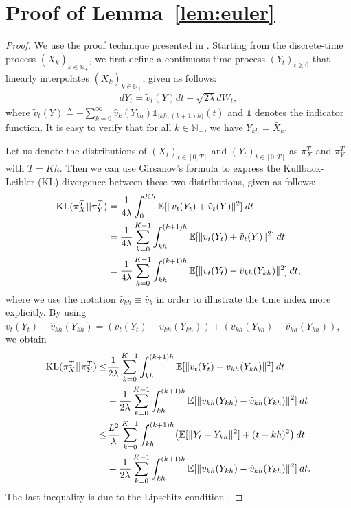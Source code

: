 \section{Proof of Lemma~\ref{lem:euler}}
%
%
\begin{proof}
We use the proof technique presented in \cite{dalalyan2017theoretical,raginsky17a}. Starting from the discrete-time process $(\bar{X}_k)_{k\in \mathbb{N}_+}$, we first define a continuous-time process $(Y_t)_{t\geq 0}$ that linearly interpolates $(\bar{X}_k)_{k\in \mathbb{N}_+}$, given as follows: 
\begin{align}
d Y_t = \tilde{v}_t(Y) dt + \sqrt{2 \lambda} dW_t, \label{eqn:sde_linear}
\end{align}
where $\tilde{v}_t(Y) \triangleq - \sum_{k=0}^{\infty} \hat{v}_k (Y_{kh}) \mathds{1}_{[kh, (k+1)h)}(t)$ and $\mathds{1}$ denotes the indicator function. It is easy to verify that for all $k \in \mathbb{N}_+$, we have $Y_{kh} = \bar{X}_k$. 

Let us denote the distributions of $(X_t)_{t \in [0,T]}$ and $(Y_t)_{t \in [0,T]}$ as $\pi_{X}^T$ and $\pi_{Y}^T$ with $T = Kh$. Then we can use Girsanov's formula to express the Kullback-Leibler (KL) divergence between these two distributions, given as follows:
\begin{align}
\textnormal{KL} (\pi_{X}^T || \pi_{Y}^T) &= \frac1{4 \lambda} \int_0^{Kh} \mathbb{E}[ \|v_t(Y_t) + \tilde{v}_t(Y) \|^2 ]  \> dt \\
&= \frac1{4 \lambda} \sum_{k=0}^{K-1} \int_{kh}^{(k+1)h} \mathbb{E}[ \|v_t(Y_t) + \tilde{v}_t(Y) \|^2 ] \> dt \\
&= \frac1{4 \lambda} \sum_{k=0}^{K-1} \int_{kh}^{(k+1)h} \mathbb{E}[ \|v_t(Y_t) - \hat{v}_{kh}(Y_{kh}) \|^2 ] \> dt,
\end{align}
where we use the notation $\hat{v}_{kh} \equiv \hat{v}_{k}$ in order to illustrate the time index more explicitly. By using $v_t(Y_t) - \hat{v}_{kh}(Y_{kh}) = ( v_t(Y_t) - v_{kh}(Y_{kh})) + ( v_{kh}(Y_{kh}) - \hat{v}_{kh}(Y_{kh}))$, we obtain
%
\begin{align}
\nonumber \textnormal{KL} (\pi_{X}^T || \pi_{Y}^T) \leq& \frac1{2 \lambda} \sum_{k=0}^{K-1} \int_{kh}^{(k+1)h} \mathbb{E}[ \|v_t(Y_t) - {v}_{kh}(Y_{kh}) \|^2 ] \> dt \\
&+  \frac1{2 \lambda} \sum_{k=0}^{K-1} \int_{kh}^{(k+1)h} \mathbb{E}[ \|v_{kh}(Y_{kh}) - \hat{v}_{kh}(Y_{kh}) \|^2 ] \> dt \\
\nonumber \leq& \frac{L^2}{\lambda} \sum_{k=0}^{K-1} \int_{kh}^{(k+1)h} \bigl(\mathbb{E}[ \|Y_t - Y_{kh} \|^2 ] + (t-kh)^2 \bigr)  \> dt \\
&+  \frac1{2 \lambda} \sum_{k=0}^{K-1} \int_{kh}^{(k+1)h} \mathbb{E}[ \|v_{kh}(Y_{kh}) - \hat{v}_{kh}(Y_{kh}) \|^2 ] \> dt . \label{eqn:lem1_proof_interm}
\end{align}
The last inequality is due to the Lipschitz condition .


\end{proof}
